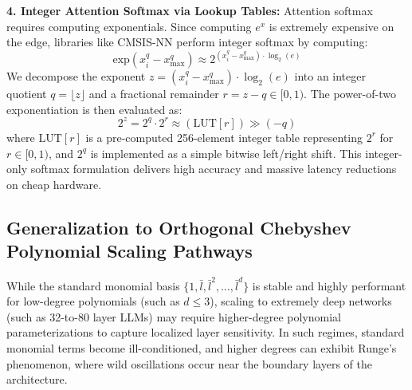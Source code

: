 \textbf{4. Integer Attention Softmax via Lookup Tables:}
Attention softmax requires computing exponentials. Since computing $e^x$ is extremely expensive on the edge, libraries like CMSIS-NN perform integer softmax by computing:
\begin{equation}
\text{exp}(x^q_i - x^q_{\max}) \approx 2^{(x^q_i - x^q_{\max}) \cdot \log_2(e)}
\end{equation}
We decompose the exponent $z = (x^q_i - x^q_{\max}) \cdot \log_2(e)$ into an integer quotient $q = \lfloor z \rfloor$ and a fractional remainder $r = z - q \in [0, 1)$. The power-of-two exponentiation is then evaluated as:
\begin{equation}
2^z = 2^q \cdot 2^r \approx \left( \text{LUT}[r] \right) \gg (-q)
\end{equation}
where $\text{LUT}[r]$ is a pre-computed 256-element integer table representing $2^r$ for $r \in [0, 1)$, and $2^q$ is implemented as a simple bitwise left/right shift. This integer-only softmax formulation delivers high accuracy and massive latency reductions on cheap hardware.

\subsection{Generalization to Orthogonal Chebyshev Polynomial Scaling Pathways}
\label{sec:appendix_chebyshev_scaling}
While the standard monomial basis $\{1, \bar{l}, \bar{l}^2, \dots, \bar{l}^d\}$ is stable and highly performant for low-degree polynomials (such as $d \le 3$), scaling to extremely deep networks (such as 32-to-80 layer LLMs) may require higher-degree polynomial parameterizations to capture localized layer sensitivity. In such regimes, standard monomial terms become ill-conditioned, and higher degrees can exhibit Runge's phenomenon, where wild oscillations occur near the boundary layers of the architecture.

